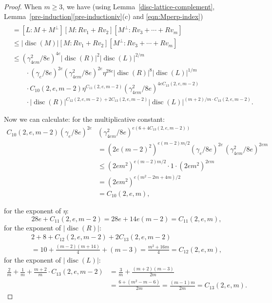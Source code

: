 \documentclass[JEP,XML,SOM,Unicode,NoFloatCountersInSection]{cedram}
\DeclareMathOperator{\disc}{disc}
\newcommand{\abs}[1]{\lvert #1 \rvert}
\begin{document}
\begin{proof}
When $m \geq 3$, we have (using Lemma~\ref{disc-lattice-complement}, Lemma~\ref{pre-induction}\eqref{pre-inductioniv}(c) and \eqref{eqn:Mperp-index})
\begin{align*}
[L : Rv_1 &+ \dotsb + Rv_m]
\\& = [L : M + M^\perp] [M : Rv_1 + Rv_2] [M^\perp : Rv_3 + \dotsb + Rv_m]
\\& \leq \abs{\disc(M)} [M : Rv_1 + Rv_2] [M^\perp : Rv_3 + \dotsb + Rv_m]
\\& \leq (\gamma_{4em}^2/8e)^{4e} \abs{\disc(R)}^2 \abs{\disc(L)}^{2/m}
\\& \qquad \cdot (\gamma_e/8e)^{2e} (\gamma_{4em}^2/8e)^{2e} \eta^{28e} \abs{\disc(R)}^8 \abs{\disc(L)}^{1/m}
\\& \qquad \cdot C_{10}(2,e,m-2) \eta^{C_{11}(2,e,m-2)} (\gamma_{4em}^2/8e)^{4eC_{13}(2,e,m-2)}
\\& \qquad \cdot \abs{\disc(R)}^{C_{12}(2,e,m-2) + 2C_{13}(2,e,m-2)} \abs{\disc(L)}^{(m+2)/m \cdot C_{13}(2,e,m-2)}.
\end{align*}

Now we can calculate:
for the multiplicative constant:
\begin{align*}
C_{10}(2,e,m-2) (\gamma_e/8e)^{2e}& (\gamma_{4em}^2/8e)^{e(6+4C_{13}(2,e,m-2))}
\\& = (2e(m-2)^2)^{e(m-2)m/2} (\gamma_e/8e)^{2e} \, (\gamma_{4em}^2/8e)^{2em}
\\& \leq (2em^2)^{e(m-2)m/2} \cdot 1 \cdot (2em^2)^{2em}
\\& = (2em^2)^{e(m^2-2m + 4m)/2}
\\& = C_{10}(2,e,m),
\end{align*}

for the exponent of $\eta$:
\[
28e + C_{11}(2,e,m-2) = 28e + 14e(m-2) = C_{11}(2,e,m),
\]
for the exponent of $\abs{\disc(R)}$:
\begin{multline*}
2 + 8 + C_{12}(2,e,m-2) + 2C_{13}(2,e,m-2)
\\
= 10 + \frac{(m-2)(m+14)}{4} + (m-3)
= \frac{m^2+16m}{4} = C_{12}(2,e,m),
\end{multline*}
for the exponent of $\abs{\disc(L)}$:
\begin{align*}
\frac{2}{m} + \frac{1}{m} + \frac{m+2}{m} \cdot C_{13}(2,e,m-2)
& = \frac{3}{m} + \frac{(m+2)(m-3)}{2m}
\\& = \frac{6+(m^2-m-6)}{2m} = \frac{(m-1)m}{2m} = C_{13}(2,e,m).
\end{align*}


\end{proof}
\end{document}
